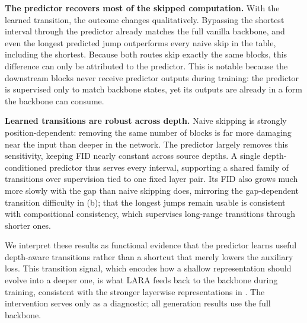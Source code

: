 \textbf{The predictor recovers most of the skipped computation.} With the learned transition, the outcome changes qualitatively. Bypassing the shortest interval through the predictor already matches the full vanilla backbone, and even the longest predicted jump outperforms every naive skip in the table, including the shortest. Because both routes skip exactly the same blocks, this difference can only be attributed to the predictor. This is notable because the downstream blocks never receive predictor outputs during training: the predictor is supervised only to match backbone states, yet its outputs are already in a form the backbone can consume.

\textbf{Learned transitions are robust across depth.} Naive skipping is strongly position-dependent: removing the same number of blocks is far more damaging near the input than deeper in the network. The predictor largely removes this sensitivity, keeping FID nearly constant across source depths. A single depth-conditioned predictor thus serves every interval, supporting a shared family of transitions over supervision tied to one fixed layer pair. Its FID also grows much more slowly with the gap than naive skipping does, mirroring the gap-dependent transition difficulty in (b); that the longest jumps remain usable is consistent with compositional consistency, which supervises long-range transitions through shorter ones.

We interpret these results as functional evidence that the predictor learns useful depth-aware transitions rather than a shortcut that merely lowers the auxiliary loss. This transition signal, which encodes how a shallow representation should evolve into a deeper one, is what LARA feeds back to the backbone during training, consistent with the stronger layerwise representations in . The intervention serves only as a diagnostic; all generation results use the full backbone.

\FloatBarrier
